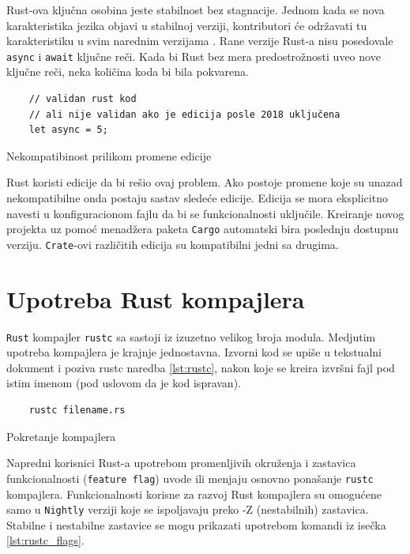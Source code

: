 \documentclass[11pt]{article}
\begin{document}
Rust-ova ključna osobina jeste stabilnost bez stagnacije. Jednom kada se nova 
karakteristika jezika objavi u stabilnoj verziji, kontributori će održavati 
tu karakteristiku u svim narednim verzijama \cite{editions}.
Rane verzije Rust-a nisu posedovale \verb|async| i \verb|await| ključne reči.
Kada bi Rust bez mera predostrožnosti uveo nove ključne reči, neka količina koda bi bila pokvarena.

\begin{listing}[H]
\begin{verbatim}
    // validan rust kod 
    // ali nije validan ako je edicija posle 2018 uključena
    let async = 5; 
\end{verbatim}
\caption{Nekompatibinost prilikom promene edicije}
\label{lst:edition}
\end{listing}


Rust koristi edicije da bi rešio ovaj problem. Ako postoje promene koje su unazad 
nekompatibilne onda postaju sastav sledeće edicije. Edicija se mora eksplicitno navesti 
u konfiguracionom fajlu da bi se funkcionalnosti uključile. Kreiranje novog projekta uz 
pomoć menadžera paketa \verb|Cargo| automatski bira poslednju dostupnu verziju.
\verb|Crate|-ovi različitih edicija su kompatibilni jedni sa drugima.




\newpage

\section{Upotreba Rust kompajlera}

\verb|Rust| kompajler \verb|rustc| sa sastoji iz izuzetno velikog broja modula. 
Medjutim upotreba kompajlera je krajnje jednostavna.
Izvorni kod se upiše u tekstualni dokument i poziva rustc naredba \ref{lst:rustc}, 
nakon koje se kreira izvršni fajl pod istim imenom (pod uslovom da je kod ispravan).
\begin{listing}[H]
\begin{verbatim}
    rustc filename.rs
\end{verbatim}
\caption{Pokretanje kompajlera}
\label{lst:rustc}
\end{listing}
Napredni korisnici Rust-a upotrebom promenljivih okruženja i zastavica funkcionalnosti 
(\verb|feature flag|) uvode ili menjaju osnovno ponašanje \verb|rustc| kompajlera.
Funkcionalnosti korisne za razvoj Rust kompajlera su omogućene samo u \verb|Nightly| verziji koje se
ispoljavaju preko -Z (nestabilnih) zastavica. Stabilne i nestabilne zastavice se mogu prikazati upotrebom
komandi iz isečka \ref{lst:rustc_flags}.
\end{document}
